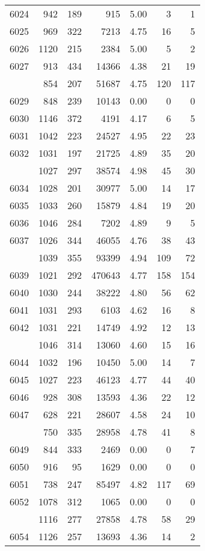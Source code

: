 \documentclass[
]{article}
\begin{document}
\begin{table}
\begin{tabular}[t]{lrrrrrr}
6024 & 942 & 189 & 915 & 5.00 & 3 & 1\\
6025 & 969 & 322 & 7213 & 4.75 & 16 & 5\\
6026 & 1120 & 215 & 2384 & 5.00 & 5 & 2\\
6027 & 913 & 434 & 14366 & 4.38 & 21 & 19\\
\addlinespace
6028 & 854 & 207 & 51687 & 4.75 & 120 & 117\\
6029 & 848 & 239 & 10143 & 0.00 & 0 & 0\\
6030 & 1146 & 372 & 4191 & 4.17 & 6 & 5\\
6031 & 1042 & 223 & 24527 & 4.95 & 22 & 23\\
6032 & 1031 & 197 & 21725 & 4.89 & 35 & 20\\
\addlinespace
6033 & 1027 & 297 & 38574 & 4.98 & 45 & 30\\
6034 & 1028 & 201 & 30977 & 5.00 & 14 & 17\\
6035 & 1033 & 260 & 15879 & 4.84 & 19 & 20\\
6036 & 1046 & 284 & 7202 & 4.89 & 9 & 5\\
6037 & 1026 & 344 & 46055 & 4.76 & 38 & 43\\
\addlinespace
6038 & 1039 & 355 & 93399 & 4.94 & 109 & 72\\
6039 & 1021 & 292 & 470643 & 4.77 & 158 & 154\\
6040 & 1030 & 244 & 38222 & 4.80 & 56 & 62\\
6041 & 1031 & 293 & 6103 & 4.62 & 16 & 8\\
6042 & 1031 & 221 & 14749 & 4.92 & 12 & 13\\
\addlinespace
6043 & 1046 & 314 & 13060 & 4.60 & 15 & 16\\
6044 & 1032 & 196 & 10450 & 5.00 & 14 & 7\\
6045 & 1027 & 223 & 46123 & 4.77 & 44 & 40\\
6046 & 928 & 308 & 13593 & 4.36 & 22 & 12\\
6047 & 628 & 221 & 28607 & 4.58 & 24 & 10\\
\addlinespace
6048 & 750 & 335 & 28958 & 4.78 & 41 & 8\\
6049 & 844 & 333 & 2469 & 0.00 & 0 & 7\\
6050 & 916 & 95 & 1629 & 0.00 & 0 & 0\\
6051 & 738 & 247 & 85497 & 4.82 & 117 & 69\\
6052 & 1078 & 312 & 1065 & 0.00 & 0 & 0\\
\addlinespace
6053 & 1116 & 277 & 27858 & 4.78 & 58 & 29\\
6054 & 1126 & 257 & 13693 & 4.36 & 14 & 2\\

\end{tabular}
\end{table}
\end{document}
